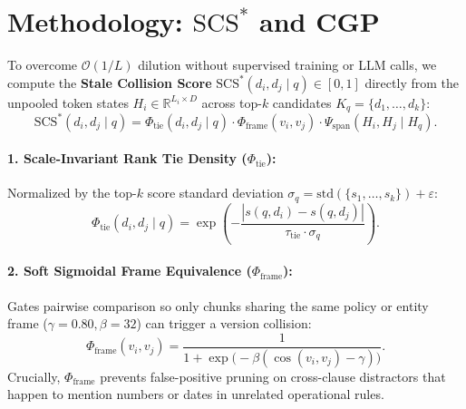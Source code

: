\documentclass[11pt,a4paper]{article}
\theoremstyle{definition}
\newcommand{\SCS}{\mathrm{SCS}^*}
\begin{document}
\section{Methodology: \texorpdfstring{$\SCS$}{SCS*} and CGP}
To overcome $\mathcal{O}(1/L)$ dilution without supervised training or LLM calls, we compute the \textbf{Stale Collision Score} $\SCS(d_i, d_j \mid q) \in [0, 1]$ directly from the unpooled token states $H_i \in \mathbb{R}^{L_i \times D}$ across top-$k$ candidates $K_q = \{d_1, \dots, d_k\}$:
\begin{equation}
\SCS(d_i, d_j \mid q) = \Phi_{\mathrm{tie}}(d_i, d_j \mid q) \cdot \Phi_{\mathrm{frame}}(v_i, v_j) \cdot \Psi_{\mathrm{span}}(H_i, H_j \mid H_q).
\end{equation}

\paragraph{1. Scale-Invariant Rank Tie Density ($\Phi_{\mathrm{tie}}$):} Normalized by the top-$k$ score standard deviation $\sigma_q = \mathrm{std}(\{s_1, \dots, s_k\}) + \varepsilon$:
\begin{equation}
\Phi_{\mathrm{tie}}(d_i, d_j \mid q) = \exp\!\left(-\frac{|s(q, d_i) - s(q, d_j)|}{\tau_{\mathrm{tie}} \cdot \sigma_q}\right).
\end{equation}

\paragraph{2. Soft Sigmoidal Frame Equivalence ($\Phi_{\mathrm{frame}}$):} Gates pairwise comparison so only chunks sharing the same policy or entity frame ($\gamma = 0.80, \beta = 32$) can trigger a version collision:
\begin{equation}
\Phi_{\mathrm{frame}}(v_i, v_j) = \frac{1}{1 + \exp\bigl(-\beta(\cos(v_i, v_j) - \gamma)\bigr)}.
\end{equation}
Crucially, $\Phi_{\mathrm{frame}}$ prevents false-positive pruning on cross-clause distractors that happen to mention numbers or dates in unrelated operational rules.
\end{document}

